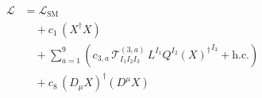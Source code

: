\documentclass{article}
\begin{document}
\begin{align*}\mathcal{L} &= \mathcal{L}_{\mathrm{SM}}\\ &\quad + c_{1}\,\left(X^{\dagger} X\right)\\ &\quad + \sum_{a=1}^{9} \left(c_{3,a}\,\mathcal{T}^{(3,a)}_{I_{1} I_{2} I_{3}}\,{L}^{I_{1}} {Q}^{I_{2}} {(X)^{\dagger}}^{I_{3}} + \mathrm{h.c.}\right)\\ &\quad + c_{8}\,\left(D_{\mu} X\right)^{\dagger}\left(D^{\mu} X\right)\end{align*}
\end{document}
